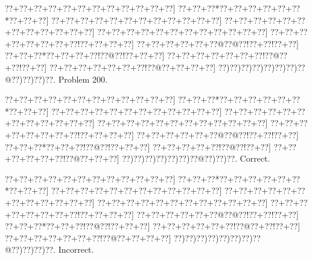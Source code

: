 \documentclass[a5paper]{article}
\begin{document}
\newpage
\begin{center}
{\goo
\0??+\0??+\0??+\0??+\0??+\0??+\0??+\0??+\0??+\0??+\0??+\0??]
\0??+\0??+\0??*\0??+\0??+\0??+\0??+\0??+\0??*\0??+\0??+\0??]
\0??+\0??+\0??+\0??+\0??+\0??+\0??+\0??+\0??+\0??+\0??+\0??]
\0??+\0??+\0??+\0??+\0??+\0??+\0??+\0??+\0??+\0??+\0??+\0??]
\0??+\0??+\0??+\0??+\0??+\0??+\0??+\0??+\0??+\0??+\0??+\0??]
\0??+\0??+\0??+\0??+\0??+\0??+\0??+\0??!\0??+\0??+\0??+\0??]
\0??+\0??+\0??+\0??+\0??+\0??@\0??@\0??!\0??+\0??!\0??+\0??]
\0??+\0??+\0??*\0??+\0??+\0??+\0??!\0??@\0??!\0??+\0??+\0??]
\0??+\0??+\0??+\0??+\0??+\0??+\0??!\0??@\0??+\0??!\0??+\0??]
\0??+\0??+\0??+\0??+\0??+\0??+\0??!\0??@\0??+\0??+\0??+\0??]
\0??)\0??)\0??)\0??)\0??)\0??)\0??)\0??@\0??)\0??)\0??)\0??.
}
Problem 200.

\end{center}
\begin{center}
{\goo
\0??+\0??+\0??+\0??+\0??+\0??+\0??+\0??+\0??+\0??+\0??+\0??]
\0??+\0??+\0??*\0??+\0??+\0??+\0??+\0??+\0??*\0??+\0??+\0??]
\0??+\0??+\0??+\0??+\0??+\0??+\0??+\0??+\0??+\0??+\0??+\0??]
\0??+\0??+\0??+\0??+\0??+\0??+\0??+\0??+\0??+\0??+\0??+\0??]
\0??+\0??+\0??+\0??+\0??+\0??+\0??+\0??+\0??+\0??+\0??+\0??]
\0??+\0??+\0??+\0??+\0??+\0??+\0??+\0??!\0??+\0??+\0??+\0??]
\0??+\0??+\0??+\0??+\0??+\0??@\0??@\0??!\0??+\0??!\0??+\0??]
\0??+\0??+\0??*\0??+\0??+\0??!\0??@\0??!\0??+\0??+\0??]
\0??+\0??+\0??+\0??+\0??!\0??@\0??!\0??+\0??]
\0??+\0??+\0??+\0??+\0??+\0??!\0??@\0??+\0??+\0??]
\0??)\0??)\0??)\0??)\0??)\0??)\0??@\0??)\0??)\0??.
}
Correct. 

\end{center}
\begin{center}
{\goo
\0??+\0??+\0??+\0??+\0??+\0??+\0??+\0??+\0??+\0??+\0??+\0??]
\0??+\0??+\0??*\0??+\0??+\0??+\0??+\0??+\0??*\0??+\0??+\0??]
\0??+\0??+\0??+\0??+\0??+\0??+\0??+\0??+\0??+\0??+\0??+\0??]
\0??+\0??+\0??+\0??+\0??+\0??+\0??+\0??+\0??+\0??+\0??+\0??]
\0??+\0??+\0??+\0??+\0??+\0??+\0??+\0??+\0??+\0??+\0??+\0??]
\0??+\0??+\0??+\0??+\0??+\0??+\0??+\0??!\0??+\0??+\0??+\0??]
\0??+\0??+\0??+\0??+\0??+\0??@\0??@\0??!\0??+\0??!\0??+\0??]
\0??+\0??+\0??*\0??+\0??+\0??!\0??@\0??!\0??+\0??+\0??]
\0??+\0??+\0??+\0??+\0??+\0??!\0??@\0??+\0??!\0??+\0??]
\0??+\0??+\0??+\0??+\0??+\0??+\0??!\0??@\0??+\0??+\0??+\0??]
\0??)\0??)\0??)\0??)\0??)\0??)\0??)\0??@\0??)\0??)\0??)\0??.
}
Incorrect. 

\end{center}
\newpage
\end{document}
